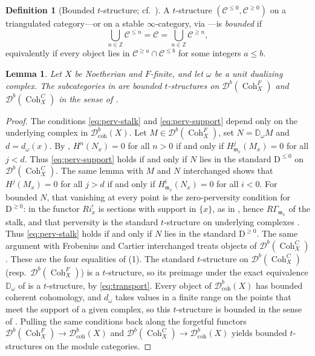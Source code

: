 \documentclass[11pt]{amsart}
\newcommand{\cC}{\mathcal{C}}
\newcommand{\Coh}{\operatorname{{Coh}}}
\newcommand{\Db}{\mathcal D^b}
\theoremstyle{plain}
\newtheorem{lemma}[lemma]{Lemma}
\theoremstyle{definition}
\newtheorem{definition}[definition]{Definition}
\numberwithin{equation}{section}
\begin{document}
\begin{definition}[{Bounded $t$-structure; cf.\ \cite[1.3.3]{BBD}}]\label{def:bounded-t}
A $t$-structure $(\cC^{\leq0},\cC^{\geq0})$ on a triangulated category---or on a stable $\infty$-category, via \cite[Definition 1.2.1.4]{HA}---is \emph{bounded} if
\[
 \bigcup_{n\in\mathbb Z}\cC^{\leq n}
 =\cC
 =\bigcup_{n\in\mathbb Z}\cC^{\geq n},
\]
equivalently if every object lies in $\cC^{\geq a}\cap\cC^{\leq b}$ for some integers $a\leq b$.
\end{definition}

\begin{lemma}\label{lem:perverse-t}
Let $X$ be Noetherian and $F$-finite, and let $\omega$ be a unit dualizing complex.
The subcategories in  are bounded $t$-structures on $\Db(\Coh^F_X)$ and $\Db(\Coh^C_X)$ in the sense of .
\end{lemma}
\begin{proof}
The conditions \eqref{eq:perv-stalk} and \eqref{eq:perv-support} depend only on the underlying complex in $\mathcal D^b_{\mathrm{coh}}(X)$.
Let $M\in\Db(\Coh^F_X)$, set $N=\mathbb D_\omega M$ and $d=d_\omega(x)$.
By , $H^n(N_x)=0$ for all $n>0$ if and only if $H^{j}_{\mathfrak m_x}(M_x)=0$ for all $j<d$.
Thus \eqref{eq:perv-support} holds if and only if $N$ lies in the standard $\mathrm D^{\leq0}$ on $\Db(\Coh^C_X)$.
The same lemma with $M$ and $N$ interchanged shows that $H^j(M_x)=0$ for all $j>d$ if and only if $H^i_{\mathfrak m_x}(N_x)=0$ for all $i<0$.
For bounded $N$, that vanishing at every point is the zero-perversity condition for $\mathrm D^{\geq0}$: in \cite[Theorem 6.6]{MWC} the functor $Ri^!_x$ is sections with support in $\{x\}$, as in \cite[Chapter IV, Variation 8]{Har}, hence $R\Gamma_{\mathfrak m_x}$ of the stalk, and that perversity is the standard $t$-structure on underlying complexes \cite[Lemma 6.7]{MWC}.
Thus \eqref{eq:perv-stalk} holds if and only if $N$ lies in the standard $\mathrm D^{\geq0}$.
The same argument with Frobenius and Cartier interchanged treats objects of $\Db(\Coh^C_X)$.
These are the four equalities of (1).
The standard $t$-structure on $\Db(\Coh^C_X)$ (resp.\ $\Db(\Coh^F_X)$) is a $t$-structure, so its preimage under the exact equivalence $\mathbb D_\omega$ of  is a $t$-structure, by \eqref{eq:transport}.
Every object of $\mathcal D^b_{\mathrm{coh}}(X)$ has bounded coherent cohomology, and $d_\omega$ takes values in a finite range on the points that meet the support of a given complex, so this $t$-structure is bounded in the sense of .
Pulling the same conditions back along the forgetful functors $\Db(\Coh^F_X)\to\mathcal D^b_{\mathrm{coh}}(X)$ and $\Db(\Coh^C_X)\to\mathcal D^b_{\mathrm{coh}}(X)$ yields bounded $t$-structures on the module categories.
\end{proof}
\end{document}
